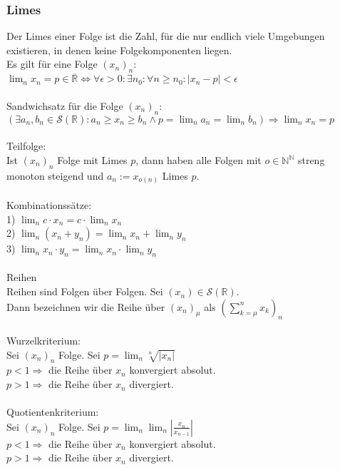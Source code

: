 \documentclass{article}
\begin{document}
\subsubsection*{Limes}
Der Limes einer Folge ist die Zahl, für die nur endlich viele Umgebungen existieren, in denen keine Folgekomponenten liegen.\\
Es gilt für eine Folge \((x_n)_n\):\\
\(\lim_n x_n = p \in \overline{\mathbb{R}} \Longleftrightarrow \forall \epsilon > 0: \exists n_0: \forall n \ge n_0: |x_n - p| < \epsilon\) \\ \\
Sandwichsatz für die Folge \((x_n)_n\):\\
\((\exists a_n, b_n \in \mathcal{S}(\mathbb R): a_n \ge x_n \ge b_n \wedge p = \lim_{n} a_n = \lim_{n} b_n) \Longrightarrow \lim_n x_n = p\) \\ \\
Teilfolge: \\
Ist \((x_n)_n\) Folge mit Limes \(p\), dann haben alle Folgen mit \(o \in \mathbb N ^ \mathbb N\) streng monoton steigend und \(a_n := x_{o(n)}\) Limes \(p\). \\ \\
Kombinationssätze:\\
1) \(\lim_n c \cdot x_n = c \cdot \lim_n x_n\) \\
2) \(\lim_n (x_n + y_n) = \lim_n x_n + \lim_n y_n\) \\
3) \(\lim_n x_n \cdot y_n = \lim_n x_n \cdot \lim_n y_n\) \\ \\
Reihen \\
Reihen sind Folgen über Folgen. Sei \((x_n) \in \mathcal{S}(\mathbb R)\).\\ Dann bezeichnen wir die Reihe über \((x_n)_\mu\) als \(\left(\sum_{k = \mu}^{n} x_k\right)_n\) \\ \\
Wurzelkriterium:\\
Sei \((x_n)_n\) Folge. Sei \(p = \lim_n \sqrt[n]{|x_n|}\) \\
\(p < 1 \Longrightarrow \) die Reihe über \(x_n\) konvergiert absolut. \\
\(p > 1 \Longrightarrow \) die Reihe über \(x_n\) divergiert. \\ \\
Quotientenkriterium:\\
Sei \((x_n)_n\) Folge. Sei \(p = \lim_n \lim_{n}|\frac{x_n}{x_{n-1}}|\) \\
\(p < 1 \Longrightarrow \) die Reihe über \(x_n\) konvergiert absolut. \\
\(p > 1 \Longrightarrow \) die Reihe über \(x_n\) divergiert. 
\end{document}
